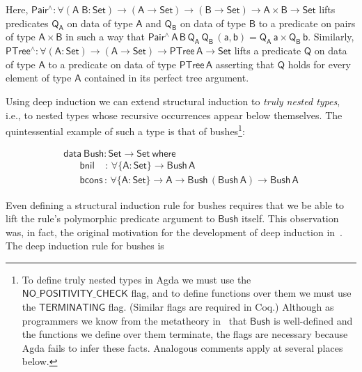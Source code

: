 \documentclass[9pt]{entcs}
\begin{document}
\vspace*{-0.075in}

\noindent
Here, $\mathsf{Pair^{\wedge} : \forall (A\; B: Set) \to (A \to Set)
  \to (B \to Set) \to A \times B \to Set}$ lifts predicates
$\mathsf{Q_A}$ on data of type $\mathsf{A}$ and $\mathsf{Q_B}$ on data
of type $\mathsf{B}$ to a predicate on pairs of type $\mathsf{A \times
  B}$ in such a way that $\mathsf{Pair^{\wedge}\,A\,B\,Q_A\,Q_B\,(a,b)
 = Q_A\,a \times Q_B\,b}$. Similarly, $\mathsf{PTree^{\wedge} :
  \forall (A : Set) \to (A \to Set) \to PTree\,A \to Set}$ lifts a
predicate $\mathsf{Q}$ on data of type $\mathsf{A}$ to a predicate on
data of type $\mathsf{PTree\,A}$ asserting that $\mathsf{Q}$ holds for
every element of type $\mathsf{A}$ contained in its perfect tree
argument.

Using deep induction we can extend structural induction to {\em truly
  nested types}, i.e., to nested types whose recursive occurrences
appear below themselves. The quintessential example of such a type is
that of bushes\footnote{To define truly nested types in Agda we must
  use the $\mathsf{NO\_POSITIVITY\_CHECK}$ flag, and to define
  functions over them we must use the $\mathsf{TERMINATING}$ flag.
  (Similar flags are required in Coq.) Although as programmers we know
  from the metatheory in~\cite{jp19} that $\mathsf{Bush}$ is
  well-defined and the functions we define over them terminate, the
  flags are necessary because Agda fails to infer these
  facts. Analogous comments apply at several places
  below.}\cite{bm98}:

\vspace*{-0.1in}

\begin{equation*}\label{eq:bush}
\begin{array}{l}
\mathsf{data\ Bush : Set \to Set\ where}\\
\mathsf{\;\;\;\;\;\;bnil\,\,\,\,\,\; :\, \forall \{A : Set\} \to Bush\,A}\\
\mathsf{\;\;\;\;\;\;bcons\, :\, \forall \{A : Set\} \to A \to Bush\,(Bush\,A) \to Bush\,A} 
\end{array}
\end{equation*}

\vspace*{0.025in}

\noindent
Even defining a structural induction rule for bushes requires that we
be able to lift the rule's polymorphic predicate argument to
$\mathsf{Bush}$ itself. This observation was, in fact, the original
motivation for the development of deep induction in~\cite{jp20}. The
deep induction rule for bushes is
\end{document}
